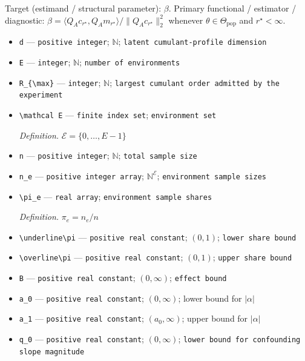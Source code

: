 \documentclass{article}
\begin{document}
Target (estimand / structural parameter): \(\beta\).
Primary functional / estimator / diagnostic: \(\beta=\langle Q_Ac_{r^\star},Q_Am_{r^\star}\rangle/\lVert Q_Ac_{r^\star}\rVert_2^2\) whenever \(\theta\in\Theta_{\mathrm{pop}}\) and \(r^\star<\infty\).
\begin{itemize}
  \item \texttt{d} --- \texttt{positive integer}; \(\mathbb N\); \texttt{latent cumulant-\allowbreak{}profile dimension}
  \item \texttt{E} --- \texttt{integer}; \(\mathbb N\); \texttt{number of environments}
  \item \texttt{R\_\allowbreak{}\{\textbackslash{}\allowbreak{}max\}\allowbreak{}} --- \texttt{integer}; \(\mathbb N\); \texttt{largest cumulant order admitted by the experiment}
  \item \texttt{\textbackslash{}\allowbreak{}mathcal E} --- \texttt{finite index set}; \texttt{environment set}
  \par\smallskip\noindent\emph{Definition.} \(\mathcal E=\{0,\ldots,E-1\}\)
  \item \texttt{n} --- \texttt{positive integer}; \(\mathbb N\); \texttt{total sample size}
  \item \texttt{n\_\allowbreak{}e} --- \texttt{positive integer array}; \(\mathbb N^{\mathcal E}\); \texttt{environment sample sizes}
  \item \texttt{\textbackslash{}\allowbreak{}pi\_\allowbreak{}e} --- \texttt{real array}; \texttt{environment sample shares}
  \par\smallskip\noindent\emph{Definition.} \(\pi_e=n_e/n\)
  \item \texttt{\textbackslash{}\allowbreak{}underline\textbackslash{}\allowbreak{}pi} --- \texttt{positive real constant}; \((0,1)\); \texttt{lower share bound}
  \item \texttt{\textbackslash{}\allowbreak{}overline\textbackslash{}\allowbreak{}pi} --- \texttt{positive real constant}; \((0,1)\); \texttt{upper share bound}
  \item \texttt{B} --- \texttt{positive real constant}; \((0,\infty)\); \texttt{effect bound}
  \item \texttt{a\_\allowbreak{}0} --- \texttt{positive real constant}; \((0,\infty)\); lower bound for \(\lvert\alpha\rvert\)
  \item \texttt{a\_\allowbreak{}1} --- \texttt{positive real constant}; \((a_0,\infty)\); upper bound for \(\lvert\alpha\rvert\)
  \item \texttt{q\_\allowbreak{}0} --- \texttt{positive real constant}; \((0,\infty)\); \texttt{lower bound for confounding slope magnitude}

\end{itemize}
\end{document}
